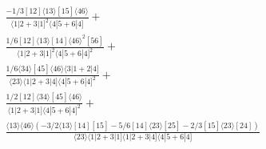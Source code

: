 \documentclass[varwidth, border=5pt]{standalone}
\begin{document}
\begin{my}
$\begin{gathered}
\scriptscriptstyle\frac{-1/3[12]⟨13⟩[15]⟨46⟩}{⟨1|2+3|1]^2⟨4|5+6|4]}+\\
\scriptscriptstyle\frac{1/6[12]⟨13⟩[14]⟨46⟩^2[56]}{⟨1|2+3|1]^2⟨4|5+6|4]^2}+\\
\scriptscriptstyle\frac{1/6⟨34⟩[45]⟨46⟩⟨3|1+2|4]}{⟨23⟩⟨1|2+3|4]⟨4|5+6|4]^2}+\\
\scriptscriptstyle\frac{1/2[12]⟨34⟩[45]⟨46⟩}{⟨1|2+3|1]⟨4|5+6|4]^2}+\\
\scriptscriptstyle\frac{⟨13⟩⟨46⟩\scriptscriptstyle(-3/2⟨13⟩[14][15]-5/6[14]⟨23⟩[25]-2/3[15]⟨23⟩[24])}{⟨23⟩⟨1|2+3|1]⟨1|2+3|4]⟨4|5+6|4]}\phantom{+}
\end{gathered}$
\end{my}
\end{document}

